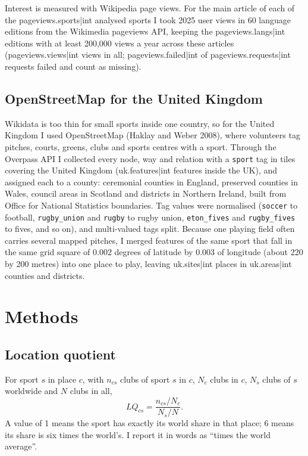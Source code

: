 \documentclass[11pt,a4paper]{article}
\begin{document}
Interest is measured with Wikipedia page views. For the main article of each of the {{pageviews.sports|int}} analysed sports I took 2025 user views in 60 language editions from the Wikimedia pageviews API, keeping the {{pageviews.langs|int}} editions with at least 200,000 views a year across these articles ({{pageviews.views|int}} views in all; {{pageviews.failed|int}} of {{pageviews.requests|int}} requests failed and count as missing).

\subsection{OpenStreetMap for the United Kingdom}

Wikidata is too thin for small sports inside one country, so for the United Kingdom I used OpenStreetMap (Haklay and Weber 2008), where volunteers tag pitches, courts, greens, clubs and sports centres with a sport. Through the Overpass API I collected every node, way and relation with a \texttt{sport} tag in tiles covering the United Kingdom ({{uk.features|int}} features inside the UK), and assigned each to a county: ceremonial counties in England, preserved counties in Wales, council areas in Scotland and districts in Northern Ireland, built from Office for National Statistics boundaries. Tag values were normalised (\texttt{soccer} to football, \texttt{rugby\_union} and \texttt{rugby} to rugby union, \texttt{eton\_fives} and \texttt{rugby\_fives} to fives, and so on), and multi-valued tags split. Because one playing field often carries several mapped pitches, I merged features of the same sport that fall in the same grid square of 0.002 degrees of latitude by 0.003 of longitude (about 220 by 200 metres) into one place to play, leaving {{uk.sites|int}} places in {{uk.areas|int}} counties and districts.

\section{Methods}

\subsection{Location quotient}

For sport $s$ in place $c$, with $n_{cs}$ clubs of sport $s$ in $c$, $N_c$ clubs in $c$, $N_s$ clubs of $s$ worldwide and $N$ clubs in all,
\[ LQ_{cs} = \frac{n_{cs}/N_c}{N_s/N}. \]
A value of 1 means the sport has exactly its world share in that place; 6 means its share is six times the world's. I report it in words as ``times the world average''.
\end{document}
